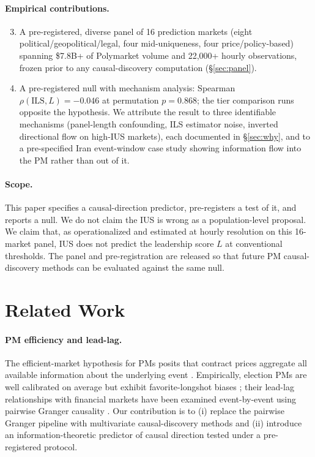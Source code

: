 \documentclass{article}
\begin{document}
\paragraph{Empirical contributions.}
\begin{enumerate}\setcounter{enumi}{2}
\item A pre-registered, diverse panel of 16 prediction markets (eight political/geopolitical/legal, four mid-uniqueness, four price/policy-based) spanning \$7.8B+ of Polymarket volume and 22{,}000+ hourly observations, frozen prior to any causal-discovery computation (\S\ref{sec:panel}).
\item A pre-registered null with mechanism analysis: Spearman $\rho(\mathrm{ILS}, L) = -0.046$ at permutation $p = 0.868$; the tier comparison runs opposite the hypothesis. We attribute the result to three identifiable mechanisms (panel-length confounding, ILS estimator noise, inverted directional flow on high-IUS markets), each documented in \S\ref{sec:why}, and to a pre-specified Iran event-window case study showing information flow into the PM rather than out of it.
\end{enumerate}

\paragraph{Scope.}
This paper specifies a causal-direction predictor, pre-registers a test of it, and reports a null. We do not claim the IUS is wrong as a population-level proposal. We claim that, as operationalized and estimated at hourly resolution on this 16-market panel, IUS does not predict the leadership score $L$ at conventional thresholds. The panel and pre-registration are released so that future PM causal-discovery methods can be evaluated against the same null.

\section{Related Work}
\label{sec:related}

\paragraph{PM efficiency and lead-lag.}
The efficient-market hypothesis for PMs posits that contract prices aggregate all available information about the underlying event \citep{manski2006interpreting}. Empirically, election PMs are well calibrated on average \citep{rothschild2009forecasting} but exhibit favorite-longshot biases \citep{snowberg2010explaining}; their lead-lag relationships with financial markets have been examined event-by-event using pairwise Granger causality \citep{tzeng2021predicting, abolghasemi2021determining}. Our contribution is to (i) replace the pairwise Granger pipeline with multivariate causal-discovery methods \citep{runge2020discovering, gerhardus2020high} and (ii) introduce an information-theoretic predictor of causal direction tested under a pre-registered protocol.
\end{document}
